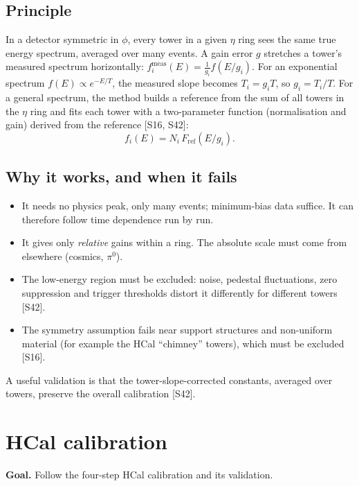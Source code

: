 \documentclass[11pt,letterpaper]{article}
\newcommand{\goal}[1]{\par\noindent\textbf{Goal.} #1\par}
\begin{document}
\subsection{Principle}
In a detector symmetric in $\phi$, every tower in a given $\eta$ ring sees the same true energy spectrum, averaged over many events.
A gain error $g$ stretches a tower's measured spectrum horizontally: $f_i^{\mathrm{meas}}(E)=\frac1{g_i}f(E/g_i)$.
For an exponential spectrum $f(E)\propto e^{-E/T}$, the measured slope becomes $T_i=g_iT$, so $g_i=T_i/T$.
For a general spectrum, the method builds a reference from the sum of all towers in the $\eta$ ring and fits each tower with a two-parameter function
(normalisation and gain) derived from the reference [S16, S42]:
\begin{equation}
f_i(E) = N_i\,F_{\mathrm{ref}}(E/g_i).
\end{equation}

\subsection{Why it works, and when it fails}
\begin{itemize}
\item It needs no physics peak, only many events; minimum-bias data suffice. It can therefore follow time dependence run by run.
\item It gives only \emph{relative} gains within a ring. The absolute scale must come from elsewhere (cosmics, $\pi^0$).
\item The low-energy region must be excluded: noise, pedestal fluctuations, zero suppression and trigger thresholds distort it differently for different towers [S42].
\item The symmetry assumption fails near support structures and non-uniform material (for example the HCal ``chimney'' towers), which must be excluded [S16].
\end{itemize}
A useful validation is that the tower-slope-corrected constants, averaged over towers, preserve the overall calibration [S42].

\section{HCal calibration}\label{sec:hcal}
\goal{Follow the four-step HCal calibration and its validation.}
\end{document}
